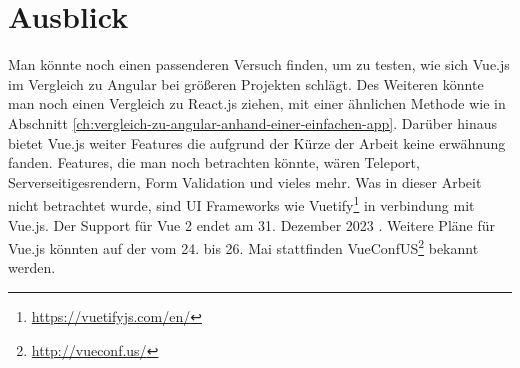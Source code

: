 
\chapter{Ausblick}
Man könnte noch einen passenderen Versuch finden, um zu testen,
wie sich Vue.js im Vergleich zu Angular bei größeren Projekten schlägt.
Des Weiteren könnte man noch einen Vergleich zu React.js ziehen,
mit einer ähnlichen Methode wie in Abschnitt \ref{ch:vergleich-zu-angular-anhand-einer-einfachen-app}.
Darüber hinaus bietet Vue.js weiter Features die aufgrund der Kürze der Arbeit keine erwähnung fanden.
Features, die man noch betrachten könnte, wären Teleport, Serverseitigesrendern, Form Validation und vieles mehr.
Was in dieser Arbeit nicht betrachtet wurde, sind UI Frameworks wie Vuetify\footnote{\url{https://vuetifyjs.com/en/}} in verbindung mit Vue.js.
Der Support für Vue 2 endet am 31. Dezember 2023 \cite{vueFAQ}.
Weitere Pläne für Vue.js könnten auf der vom 24. bis 26. Mai stattfinden VueConfUS\footnote{\url{http://vueconf.us/}} bekannt werden.